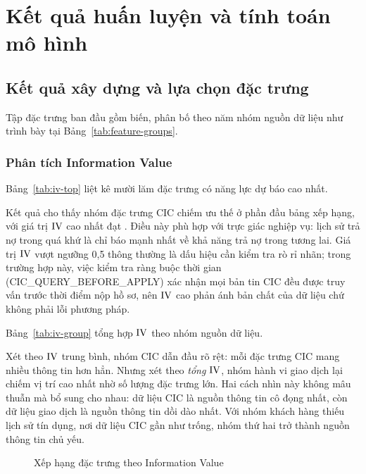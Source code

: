 \section{Kết quả huấn luyện và tính toán mô hình}
\label{sec:ket-qua-huan-luyen}

\subsection{Kết quả xây dựng và lựa chọn đặc trưng}
\label{subsec:kq-dac-trung}

Tập đặc trưng ban đầu gồm \NFeaturesInitial{} biến, phân bố theo năm nhóm nguồn
dữ liệu như trình bày tại Bảng~\ref{tab:feature-groups}.



\subsubsection{Phân tích Information Value}

Bảng~\ref{tab:iv-top} liệt kê mười lăm đặc trưng có năng lực dự báo cao nhất.



Kết quả cho thấy nhóm đặc trưng CIC chiếm ưu thế ở phần đầu bảng xếp hạng, với
giá trị $\mathrm{IV}$ cao nhất đạt \MaxIV{}. Điều này phù hợp với trực giác nghiệp vụ:
lịch sử trả nợ trong quá khứ là chỉ báo mạnh nhất về khả năng trả nợ trong tương
lai. Giá trị $\mathrm{IV}$ vượt ngưỡng 0,5 thông thường là dấu hiệu cần kiểm tra rò rỉ
nhãn; trong trường hợp này, việc kiểm tra ràng buộc thời gian
(CIC\_QUERY\_BEFORE\_APPLY) xác nhận mọi bản tin CIC đều được truy vấn trước thời
điểm nộp hồ sơ, nên $\mathrm{IV}$ cao phản ánh bản chất của dữ liệu chứ không phải lỗi
phương pháp.

Bảng~\ref{tab:iv-group} tổng hợp $\mathrm{IV}$ theo nhóm nguồn dữ liệu.



Xét theo $\mathrm{IV}$ trung bình, nhóm CIC dẫn đầu rõ rệt: mỗi đặc trưng CIC mang nhiều
thông tin hơn hẳn. Nhưng xét theo \textit{tổng} $\mathrm{IV}$, nhóm hành vi giao dịch lại
chiếm vị trí cao nhất nhờ số lượng đặc trưng lớn. Hai cách nhìn này không mâu
thuẫn mà bổ sung cho nhau: dữ liệu CIC là nguồn thông tin cô đọng nhất, còn dữ
liệu giao dịch là nguồn thông tin dồi dào nhất. Với nhóm khách hàng thiếu lịch sử
tín dụng, nơi dữ liệu CIC gần như trống, nhóm thứ hai trở thành nguồn thông tin
chủ yếu.

\begin{figure}[!htbp]
\centering
{}
\caption{Xếp hạng đặc trưng theo Information Value}
\label{fig:iv-ranking}
\end{figure}

